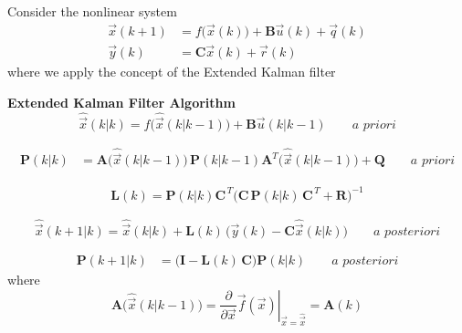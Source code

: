 \documentclass[12pt,a4paper,oneside]{book}
\begin{document}
\begin{onehalfspace}
\noindent Consider the nonlinear system
\begin{equation}\label{kfp_1_nonlinear}
	\begin{aligned}
		\vec{x}(k+1) &= f\Big(\vec{x}(k)\Big)+\mathbf{B}\vec{u}(k) + 
		\vec{q}(k)\\[6pt]
		\vec{y}(k) &= \mathbf{C}\vec{x}(k) + \vec{r}(k)
	\end{aligned}
\end{equation}
where we apply the concept of the Extended Kalman filter
\begin{mybox}
	\noindent\textbf{Extended Kalman Filter Algorithm}
	\begin{equation}\label{ks1}
		\hat{\vec{x}}\left(k|k\right) = 
		f\Big(\hat{\vec{x}}\left(k|k-1\right)\Big) + \mathbf{B} 
		\vec{u}\left(k|k-1\right) \qquad \textit{a priori}
	\end{equation}
	
	\begin{equation}\label{ks2}
		\begin{aligned}
			\mathbf{P}\left(k|k\right) &= 
			\mathbf{A}\Big(\hat{\vec{x}}\left(k|k-1\right)\Big)\,\mathbf{P}\left(k|k-1\right)
			 \mathbf{A}^T\Big(\hat{\vec{x}}\left(k|k-1\right)\Big) + \mathbf{Q} 
			\qquad \textit{a priori}
		\end{aligned}
	\end{equation}
	
	\begin{equation}\label{ks3}
		\begin{aligned}
			\mathbf{L}(k) = 
			\mathbf{P}(k|k)\mathbf{C}^{\,T}\Big(\mathbf{C}\,\mathbf{P}(k|k)\,\mathbf{C}^{\,T}+\mathbf{R}\Big)^{-1}
		\end{aligned}
	\end{equation}
	
	\begin{equation}\label{ks4}
		\hat{\vec{x}}\left(k+1|k\right) = \hat{\vec{x}}\left(k|k\right) + 
		\mathbf{L}(k)\, \Big(\vec{y}(k) - 
		\mathbf{C}\hat{\vec{x}}\left(k|k\right)\Big) \qquad \textit{a 
		posteriori}
	\end{equation}
	
	\begin{equation}\label{ks5}
		\begin{aligned}
			\mathbf{P}\left(k+1|k\right) &= 
			\Big(\mathbf{I}-\mathbf{L}(k)\,\mathbf{C} \Big) 
			\mathbf{P}\left(k|k\right)  \qquad \textit{a posteriori}
		\end{aligned}
	\end{equation}
	where 
	\begin{equation}
		\mathbf{A}\Big(\hat{\vec{x}}\left(k|k-1\right)\Big) = \left. 
		\frac{\partial}{\partial 
		\vec{x}}\vec{f}(\vec{x})\right|_{\vec{x}=\hat{\vec{x}}} = \mathbf{A}(k)
	\end{equation}
\end{mybox}


\end{onehalfspace}
\end{document}
